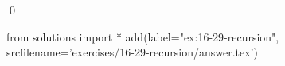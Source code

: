 
\begin{ex}
  \label{ex:16-29-recursion}
  
  \qed
\end{ex}
\begin{python0}
from solutions import *
add(label="ex:16-29-recursion",
    srcfilename='exercises/16-29-recursion/answer.tex')
\end{python0}
